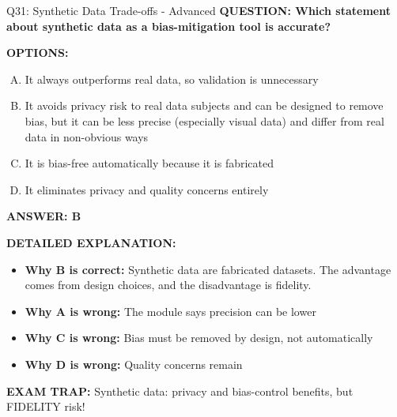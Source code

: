 \documentclass[8pt]{beamer}
\begin{document}
\begin{frame}[shrink=6]{Q31: Synthetic Data Trade-offs - Advanced}
\fontsize{6.5}{7.5}\selectfont
\textbf{QUESTION: Which statement about synthetic data as a bias-mitigation tool is accurate?}

\vspace{0.1cm}
\textbf{OPTIONS:}
\begin{enumerate}[A.]
\item It always outperforms real data, so validation is unnecessary
\item It avoids privacy risk to real data subjects and can be designed to remove bias, but it can be less precise (especially visual data) and differ from real data in non-obvious ways
\item It is bias-free automatically because it is fabricated
\item It eliminates privacy and quality concerns entirely
\end{enumerate}

\vspace{0.1cm}
\textcolor{myblue}{\textbf{ANSWER: B}}

\vspace{0.1cm}
\textbf{DETAILED EXPLANATION:}
\begin{itemize}
\item \textbf{Why B is correct:} Synthetic data are fabricated datasets. The advantage comes from design choices, and the disadvantage is fidelity.
\item \textbf{Why A is wrong:} The module says precision can be lower
\item \textbf{Why C is wrong:} Bias must be removed by design, not automatically
\item \textbf{Why D is wrong:} Quality concerns remain
\end{itemize}

\textcolor{myred}{\textbf{EXAM TRAP:}} Synthetic data: privacy and bias-control benefits, but FIDELITY risk!
\end{frame}
\end{document}
